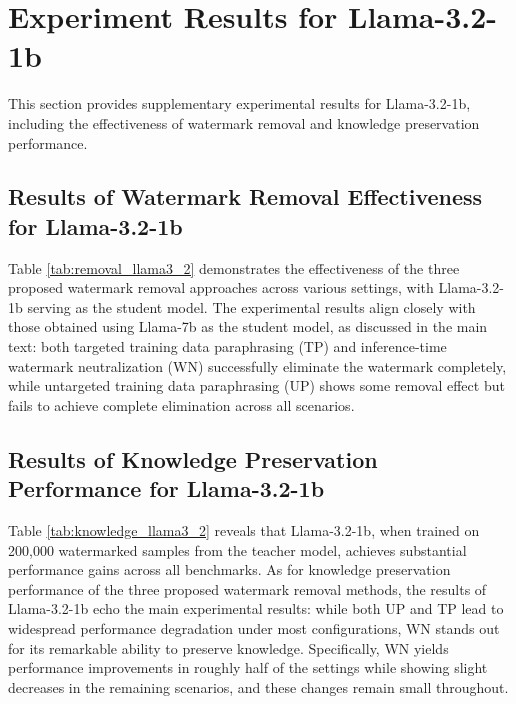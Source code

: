 \section{Experiment Results for Llama-3.2-1b}
This section provides supplementary experimental results for Llama-3.2-1b, including the effectiveness of watermark removal and knowledge preservation performance.
\subsection{Results of Watermark Removal Effectiveness for Llama-3.2-1b}
\label{sec:remove_llama3_2}

Table \ref{tab:removal_llama3_2} demonstrates the effectiveness of the three proposed watermark removal approaches across various settings, with Llama-3.2-1b serving as the student model. The experimental results align closely with those obtained using Llama-7b as the student model, as discussed in the main text: both targeted training data paraphrasing (TP) and inference-time watermark neutralization (WN) successfully eliminate the watermark completely, while untargeted training data paraphrasing (UP) shows some removal effect but fails to achieve complete elimination across all scenarios.

\subsection{Results of Knowledge Preservation Performance for Llama-3.2-1b}
\label{sec:knowledge_llama3_2}

Table \ref{tab:knowledge_llama3_2} reveals that Llama-3.2-1b, when trained on 200,000 watermarked samples from the teacher model, achieves substantial performance gains across all benchmarks. As for knowledge preservation performance of the three proposed watermark removal methods, the results of Llama-3.2-1b echo the main experimental results: while both UP and TP lead to widespread performance degradation under most configurations, WN stands out for its remarkable ability to preserve knowledge. Specifically, WN yields performance improvements in roughly half of the settings while showing slight decreases in the remaining scenarios, and these changes remain small throughout.

